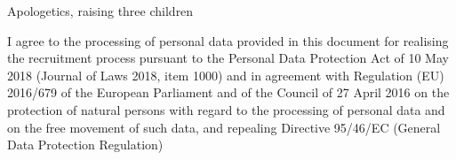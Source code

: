 \documentclass{cvClass} %
\begin{document}
   {Apologetics, raising three children}

  \vfill
    {I agree to the processing of personal data provided in this document for realising the recruitment process pursuant to the Personal Data Protection Act of 10 May 2018 (Journal of Laws 2018, item 1000) and in agreement with Regulation (EU) 2016/679 of the European Parliament and of the Council of 27 April 2016 on the protection of natural persons with regard to the processing of personal data and on the free movement of such data, and repealing Directive 95/46/EC (General Data Protection Regulation)}

\end{document}
